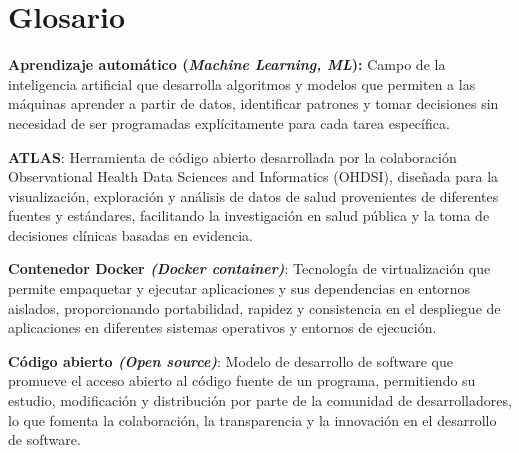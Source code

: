 \chapter{Glosario}\label{anexo:glosario}






\textbf{Aprendizaje automático (\textit{Machine Learning, ML}):} Campo de la inteligencia artificial que desarrolla algoritmos y modelos que permiten a las máquinas aprender a partir de datos, identificar patrones y tomar decisiones sin necesidad de ser programadas explícitamente para cada tarea específica.

\textbf{ATLAS}: Herramienta de código abierto desarrollada por la colaboración Observational Health Data Sciences and Informatics (OHDSI), diseñada para la visualización, exploración y análisis de datos de salud provenientes de diferentes fuentes y estándares, facilitando la investigación en salud pública y la toma de decisiones clínicas basadas en evidencia.





\textbf{Contenedor Docker \textit{(Docker container)}}: Tecnología de virtualización que permite empaquetar y ejecutar aplicaciones y sus dependencias en entornos aislados, proporcionando portabilidad, rapidez y consistencia en el despliegue de aplicaciones en diferentes sistemas operativos y entornos de ejecución.

\textbf{Código abierto \textit{(Open source)}}: Modelo de desarrollo de software que promueve el acceso abierto al código fuente de un programa, permitiendo su estudio, modificación y distribución por parte de la comunidad de desarrolladores, lo que fomenta la colaboración, la transparencia y la innovación en el desarrollo de software.


